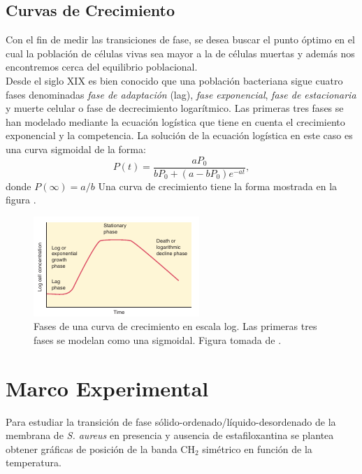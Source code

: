 \documentclass[%
 reprint,
 amsmath,amssymb,
 aps,
]{revtex4-2}
\begin{document}
\subsection{Curvas de Crecimiento}
Con el fin de medir las transiciones de fase, se desea buscar el punto \'{o}ptimo en el cual la poblaci\'{o}n de c\'{e}lulas vivas sea mayor a la de c\'{e}lulas muertas y adem\'{a}s nos encontremos cerca del equilibrio poblacional.\\
Desde el siglo XIX es bien conocido que una poblaci\'{o}n bacteriana sigue cuatro fases \cite{Unknowna} denominadas \textit{fase de adaptaci\'{o}n} (lag),  \textit{fase exponencial},  \textit{fase de estacionaria} y muerte celular o fase de decrecimiento logar\'{i}tmico. Las primeras tres fases se han modelado mediante la ecuaci\'{o}n log\'{i}stica \cite{Zill2009} que tiene en cuenta el crecimiento exponencial y la competencia. La soluci\'{o}n de la ecuaci\'{o}n log\'{i}stica en este caso es una curva sigmoidal de la forma:
\begin{equation}
    P(t)=\frac{aP_{0}}{bP_{0}+(a-bP_{0})e^{-at}},
\end{equation}\label{eq:2}
donde $P(\infty)=a/b$
Una curva de crecimiento tiene la forma mostrada en la figura .
\begin{figure}[h]
  \includegraphics[width=\linewidth]{curva.png}
  \caption{Fases de una curva de crecimiento en escala log. Las primeras tres fases se modelan como una sigmoidal. Figura tomada de \cite{Unknowna}.}
  \label{fig:curv}
\end{figure}
\section{\label{sec:exp}Marco Experimental}
Para estudiar la transici\'{o}n de fase s\'{o}lido-ordenado/l\'{i}quido-desordenado de la membrana de \textit{S. aureus} en presencia y ausencia de estafiloxantina se plantea obtener gr\'{a}ficas de posici\'{o}n de la banda CH$_{2}$ sim\'{e}trico en funci\'{o}n de la temperatura.
\end{document}
